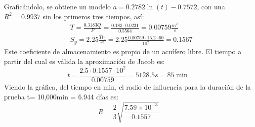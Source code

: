 Graficándolo, se obtiene un modelo $a=0.2782\ln{(t)}-0.7572$, con una $R^2=0.9937$ sin los primeros tres tiempos, así:
\begin{align*}
    &T= \frac{0.3183Q}{P}= \frac{0.183 \cdot 0.0231}{0.5564} = 0.00759 \frac{m^2}{s}\\
    &S_y = 2.25 \frac{Tt_0}{r^2} = 2.25 \frac{0.00759 \cdot 15.2 \cdot 60}{10^2} = 0.1567
\end{align*}
Este coeficiente de almacenamiento es propio de un acuífero libre. El tiempo a partir del cual es válida la aproximación de Jacob es: 
\begin{equation*}
    t = \frac{2.5 \cdot 0.1557 \cdot  10^2}{0.00759}= 5128.5 s= 85\min  
\end{equation*}
Viendo la gráfica, del tiempo en min, el radio de influencia para la duración de la prueba t= 10,000min = 6.944 días es:
\begin{equation*}
    R = \frac{2}{3} \sqrt{ \frac{7.59 \times 10^{ - 3} }{0.1557}}
\end{equation*}
